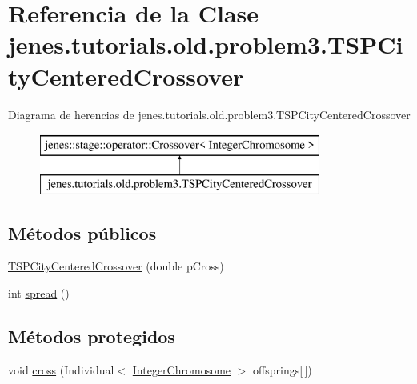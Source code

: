 \hypertarget{classjenes_1_1tutorials_1_1old_1_1problem3_1_1_t_s_p_city_centered_crossover}{\section{Referencia de la Clase jenes.\-tutorials.\-old.\-problem3.\-T\-S\-P\-City\-Centered\-Crossover}
\label{classjenes_1_1tutorials_1_1old_1_1problem3_1_1_t_s_p_city_centered_crossover}
}
Diagrama de herencias de jenes.\-tutorials.\-old.\-problem3.\-T\-S\-P\-City\-Centered\-Crossover\begin{figure}[H]
\begin{center}
\leavevmode
\includegraphics[height=2.000000cm]{classjenes_1_1tutorials_1_1old_1_1problem3_1_1_t_s_p_city_centered_crossover}
\end{center}
\end{figure}
\subsection*{Métodos públicos}
\begin{DoxyCompactItemize}
\item 
\hyperlink{classjenes_1_1tutorials_1_1old_1_1problem3_1_1_t_s_p_city_centered_crossover_a1d89f8d326252c8c65c7abc11e486722}{T\-S\-P\-City\-Centered\-Crossover} (double p\-Cross)
\item 
int \hyperlink{classjenes_1_1tutorials_1_1old_1_1problem3_1_1_t_s_p_city_centered_crossover_a8e53f91513fd450e8852d22fb5afaf17}{spread} ()
\end{DoxyCompactItemize}
\subsection*{Métodos protegidos}
\begin{DoxyCompactItemize}
\item 
void \hyperlink{classjenes_1_1tutorials_1_1old_1_1problem3_1_1_t_s_p_city_centered_crossover_ad953284beb1ccab1a3eb78c37096a3fa}{cross} (Individual$<$ \hyperlink{classjenes_1_1chromosome_1_1_integer_chromosome}{Integer\-Chromosome} $>$ offsprings\mbox{[}$\,$\mbox{]})
\end{DoxyCompactItemize}


